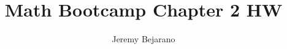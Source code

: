 \documentclass{amsart}
\begin{document}
\theoremstyle{definition}
\newtheorem{exercise}{Exercise}
\newcommand{\newproblem}[2]{
\setcounter{exercise}{#1}\addtocounter{exercise}{
    -1}\begin{exercise}#2\end{exercise}
    }
\newcommand{\setcontext}[2]{\setcounter{chapter}{#1}\setcounter{section}{#2}}
\newcommand{\s}[1]{\mathcal{#1}}
\newcommand{\R}{\mathbb{R}}
\newcommand{\N}{\mathbb{N}}
\newcommand{\F}{\mathbb{F}}
\newcommand{\C}{\mathbb{C}}
\renewcommand{\labelenumi}{(\alph{enumi})}


\title{Math Bootcamp Chapter 2 HW}
\author{Jeremy Bejarano}
\maketitle

\end{document}
